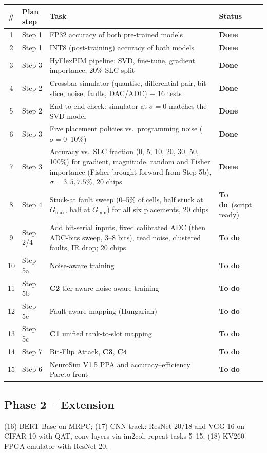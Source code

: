 \documentclass[10pt,a4paper]{article}
\newcommand{\done}{\textcolor{done}{\textbf{Done}}}
\newcommand{\todo}{\textcolor{todo}{\textbf{To do}}}
\begin{document}
\begin{table}[h]
\centering\small
\begin{tabularx}{\linewidth}{@{}c l X l@{}}
\toprule
\# & Plan step & Task & Status \\
\midrule
1 & Step 1 & FP32 accuracy of both pre-trained models & \done \\
2 & Step 1 & INT8 (post-training) accuracy of both models & \done \\
3 & Step 3 & HyFlexPIM pipeline: SVD, fine-tune, gradient importance, 20\% SLC split & \done \\
4 & Step 2 & Crossbar simulator (quantise, differential pair, bit-slice, noise, faults, DAC/ADC) + 16 tests & \done \\
5 & Step 2 & End-to-end check: simulator at $\sigma=0$ matches the SVD model & \done \\
6 & Step 3 & Five placement policies vs.\ programming noise ($\sigma=0$--10\%) & \done \\
7 & Step 3 & Accuracy vs.\ SLC fraction (0, 5, 10, 20, 30, 50, 100\%) for gradient, magnitude, random and Fisher importance (Fisher brought forward from Step 5b), $\sigma=3,5,7.5\%$, 20 chips & \done \\
8 & Step 4 & Stuck-at fault sweep (0--5\% of cells, half stuck at $G_{\max}$, half at $G_{\min}$) for all six placements, 20 chips & \todo\ (script ready) \\
9 & Step 2/4 & Add bit-serial inputs, fixed calibrated ADC (then ADC-bits sweep, 3--8 bits), read noise, clustered faults, IR drop; 20 chips & \todo \\
10 & Step 5a & Noise-aware training & \todo \\
11 & Step 5b & \textbf{C2} tier-aware noise-aware training & \todo \\
12 & Step 5c & Fault-aware mapping (Hungarian) & \todo \\
13 & Step 5c & \textbf{C1} unified rank-to-slot mapping & \todo \\
14 & Step 7 & Bit-Flip Attack, \textbf{C3}, \textbf{C4} & \todo \\
15 & Step 6 & NeuroSim V1.5 PPA and accuracy--efficiency Pareto front & \todo \\
\bottomrule
\end{tabularx}
\end{table}

\subsection{Phase 2 -- Extension}
(16) BERT-Base on MRPC; (17) CNN track: ResNet-20/18 and VGG-16 on CIFAR-10 with QAT, conv layers via
im2col, repeat tasks 5--15; (18) KV260 FPGA emulator with ResNet-20.
\end{document}
